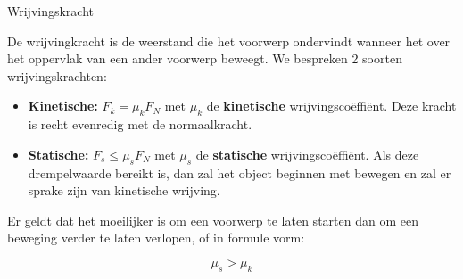 \begin{theo}[Wrijvingskracht]{Wrijvingskracht}

    De wrijvingkracht is de weerstand die het voorwerp ondervindt wanneer het over het oppervlak van een ander voorwerp beweegt. We bespreken 2 soorten wrijvingskrachten:
    
    \begin{itemize}
        \item \textbf{Kinetische:} $ F_k = \mu_kF_N$ met $ \mu_k $ de \textbf{kinetische} wrijvingscoëffiënt. Deze kracht is recht evenredig met de normaalkracht.
        \item \textbf{Statische:} $ F_s \leq \mu_sF_N$ met $ \mu_s $ de \textbf{statische} wrijvingscoëffiënt. Als deze drempelwaarde bereikt is, dan zal het object beginnen met bewegen en zal er sprake zijn van kinetische wrijving.
    \end{itemize}
    
    \noindent Er geldt dat het moeilijker is om een voorwerp te laten starten dan om een beweging verder te laten verlopen, of in formule vorm: 
    
    \begin{equation*}
        \mu_s > \mu_k
    \end{equation*} 

\end{theo}



